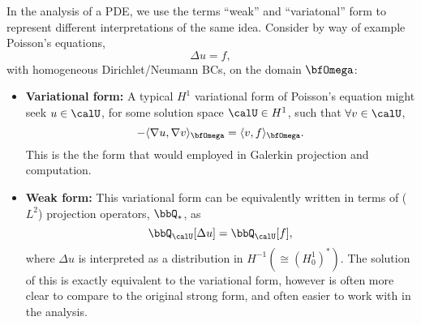     In the analysis of a PDE, we use the terms ``weak'' and ``variatonal'' form to represent different interpretations of the same idea. Consider by way of example Poisson's equations,
    \begin{equation}
        \Delta u  =  f,
    \end{equation}
    with homogeneous Dirichlet/Neumann BCs, on the domain $\bfOmega$:
    \begin{itemize}
        \item  {\bf Variational form:} A typical $H^{1}$ variational form of Poisson's equation might seek $u \in \calU$, for some solution space $\calU \in H^{1}$, such that $\forall v \in \calU$,
        \begin{equation}
            - \langle\nabla u, \nabla v\rangle_{\bfOmega}  =  \langle v, f\rangle_{\bfOmega}.
        \end{equation}
        This is the the form that would employed in Galerkin projection and computation.
        \item  {\bf Weak form:} This variational form can be equivalently written in terms of ($L^{2}$) projection operators, $\bbQ_{*}$, as
        \begin{equation}
            \bbQ_{\calU}[\Delta u]  =  \bbQ_{\calU}[f],
        \end{equation}
        where $\Delta u$ is interpreted as a distribution in $H^{- 1}  (\cong (H^{1}_{0})^{*})$. The solution of this is exactly equivalent to the variational form, however is often more clear to compare to the original strong form, and often easier to work with in the analysis.
    \end{itemize}